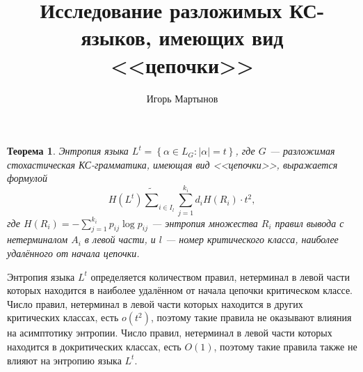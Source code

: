 \documentclass[12pt]{article}
\title{Исследование разложимых КС-языков, имеющих вид <<цепочки>>}
\author{Игорь Мартынов}
\newtheorem{theorem}{Теорема}
\begin{document}
\clearpage
\setlength{\parindent}{0pt}
\setlength{\parskip}{8pt}

\begin{theorem}
	Энтропия языка $L^t = \left\{ \alpha \in L_G : \left| \alpha \right| = t \right\}$, где $G$ --- разложимая стохастическая КС-грамматика, имеющая вид <<цепочки>>, выражается формулой
	\begin{equation*}
		H(L^t) \tilde \sum_{i \in I_l} \sum_{j = 1}^{k_i} d_i H(R_i) \cdot t^2,
	\end{equation*}
	где	$H(R_i) = - \sum_{j = 1}^{k_i} p_{ij} \log p_{ij}$ --- энтропия множества $R_i$ правил вывода с нетерминалом $A_i$ в левой части, и $l$ --- номер критического класса, наиболее удалённого от начала цепочки.
\end{theorem}

Энтропия языка $L^t$ определяется количеством правил, нетерминал в левой части которых находится в наиболее удалённом от начала цепочки критическом классе. Число правил, нетерминал в левой части которых находится в других критических классах, есть $o(t^2)$, поэтому такие правила не оказывают влияния на асимптотику энтропии. Число правил, нетерминал в левой части которых находится в докритических классах, есть $O(1)$, поэтому такие правила также не влияют на энтропию языка $L^t$.
\end{document}
